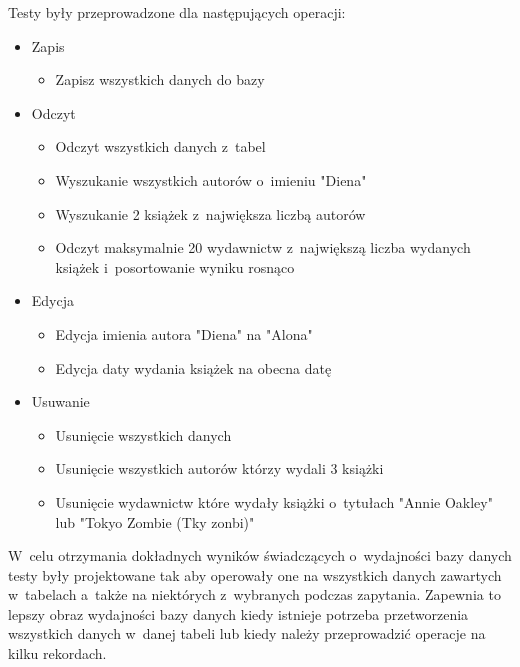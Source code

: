 Testy były przeprowadzone dla następujących operacji: 
\begin{itemize}
	 \item Zapis
  
  	\begin{itemize}
    		\item Zapisz wszystkich danych do bazy
	 \end{itemize}

	  \item Odczyt
	  
   	  \begin{itemize}
   		 \item Odczyt wszystkich danych z~tabel
	     \item Wyszukanie wszystkich autorów o~imieniu "Diena"
   		 \item Wyszukanie 2 książek z~największa liczbą autorów
     	\item Odczyt maksymalnie 20 wydawnictw z~największą liczba wydanych książek i~posortowanie wyniku rosnąco   
  		\end{itemize}
  		
 	  \item Edycja

 	  	\begin{itemize}
	    		\item Edycja imienia autora "Diena" na "Alona"
	    		\item Edycja daty wydania książek na obecna datę
		 \end{itemize}

	   \item Usuwanie
	   
	    	\begin{itemize}
	    		\item Usunięcie wszystkich danych
	    		\item Usunięcie wszystkich autorów którzy wydali 3 książki
	    		\item Usunięcie wydawnictw które wydały książki o~tytułach "Annie Oakley" lub "Tokyo Zombie (Tky zonbi)"
		 \end{itemize}	 
\end{itemize}

 W~celu otrzymania dokładnych wyników świadczących o~wydajności bazy danych testy były projektowane tak aby operowały one na wszystkich danych zawartych w~tabelach a~także na niektórych z~wybranych podczas zapytania. Zapewnia to lepszy obraz wydajności bazy danych kiedy istnieje potrzeba przetworzenia wszystkich danych w~danej tabeli lub kiedy należy przeprowadzić operacje na kilku rekordach. 


